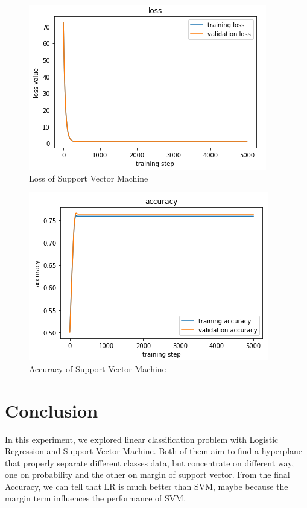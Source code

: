 \documentclass[journal, a4paper]{IEEEtran}
\begin{document}
\begin{figure}[!hbt]
\begin{center}
    \includegraphics[width=\columnwidth]{SVM_loss}
    \caption{Loss of Support Vector Machine}
    \label{fig:SVM_loss}
\end{center}
\end{figure}
\begin{figure}[!hbt]
\begin{center}
    \includegraphics[width=\columnwidth]{SVM_accuracy}
    \caption{Accuracy of Support Vector Machine}
    \label{fig:SVM_accuracy}
\end{center}
\end{figure}

\section{Conclusion}
In this experiment, we explored linear classification problem with Logistic Regression and Support Vector Machine.
Both of them aim to find a hyperplane that properly separate different classes data, but concentrate on different way, one on probability and the other on margin of support vector.
From the final Accuracy, we can tell that LR is much better than SVM, maybe because the margin term influences the performance of SVM.

\end{document}
